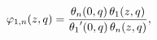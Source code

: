 \[\mathop{\varphi_{1,n}\/}\nolimits\!\left(z,q\right)=\frac{\mathop{\theta_{n}\/%
}\nolimits\!\left(0,q\right)\mathop{\theta_{1}\/}\nolimits\!\left(z,q\right)}{%
\mathop{\theta_{1}\/}\nolimits'\!\left(0,q\right)\mathop{\theta_{n}\/}%
\nolimits\!\left(z,q\right)},\]